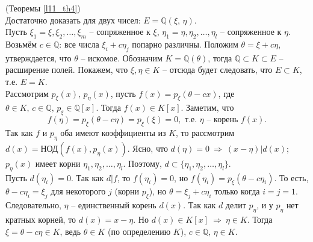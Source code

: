 \begin{pf} (Теоремы \ref{l11_th4})\\
	Достаточно доказать для двух чисел: $E=\mathbb{Q}(\xi,\,\eta)$.\\
	Пусть $\xi_1 = \xi, \xi_2,\dots,\xi_m$ -- сопряженное к $\xi$, $\eta_1 = \eta, \eta_2,\dots,\eta_l$ -- сопряженное к $\eta$. 	Возьмём $c \in \mathbb{Q}$: все числа $\xi_i + c\eta_j$ попарно различны. Положим $\theta = \xi + c\eta$, утверждается, что $\theta$ -- искомое. Обозначим $K = \mathbb{Q}(\theta)$, тогда $\mathbb{Q} \subset K \subset E$ -- расширение полей. Покажем, что $\xi, \eta \in K$ -- отсюда будет следовать, что $E \subset K$, т.е. $E=K$.\\
	Рассмотрим $p_\xi(x),\,p_\eta(x)$, пусть $f(x) = p_\xi(\theta - cx)$, где $\theta \in K, \, c \in \mathbb{Q}, \, p_\xi \in \mathbb{Q}[x]$. Тогда $f(x) \in K[x]$. Заметим, что
	$$f(\eta) = p_\xi(\theta - c\eta) = p_\xi(\xi) =0, \text{ т.е. } \eta \text{ -- корень } f(x).$$
	Так как $f$ и $p_\eta$ оба имеют коэффициенты из $K$, то рассмотрим $d(x) = \text{НОД}(f(x), p_\eta(x))$. Ясно, что $d(\eta) = 0 \ \Rightarrow \ (x-\eta) \vert d(x)$; $p_\eta(x)$ имеет корни $\eta_1, \eta_2, \dots, \eta_l$. Поэтому, $d \subset \{ \eta_1, \eta_2, \dots, \eta_l \}$.\\
	Пусть $d(\eta_i)=0$. Так как $d \vert f$, то $f(\eta_i)=0$, но $f(\eta_i) = p_\xi(\theta - c\eta_i)$. То есть, $\theta - c\eta_i = \xi_j$ для некоторого $j$ (корни $p_\xi$), но $\theta = \xi_j + c\eta_i$ только когда $i=j=1$. Следовательно, $\eta$ -- единственный корень $d(x)$. Так как $d$ делит $p_\eta$, и у $p_\eta$ нет кратных корней, то $d(x) = x - \eta$. Но $d(x) \in K[x] \ \Rightarrow \ \eta \in K$. Тогда $\xi = \theta - c\eta \in K$, ведь $\theta \in K$ (по определению $K$), $c \in \mathbb{Q}, \, \eta \in K$.
\end{pf}

